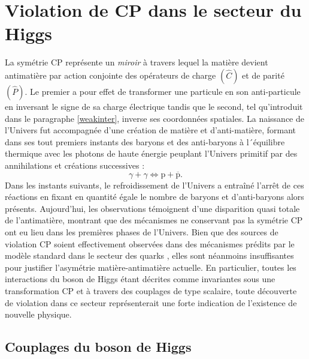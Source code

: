 \chapter{Violation de CP dans le secteur du Higgs}
\label{violCP}

La symétrie CP représente un \textit{miroir} à travers lequel la matière devient antimatière par action conjointe des opérateurs de charge $(\hat{C})$ et de parité $(\hat{P})$. Le premier a pour effet de transformer une particule en son anti-particule en inversant le signe de sa charge électrique tandis que le second, tel qu'introduit dans le paragraphe \ref{weakinter}, inverse ses coordonnées spatiales. La naissance de l'Univers fut accompagnée d'une création de matière et d'anti-matière, formant dans ses tout premiers instants des baryons et des anti-baryons à l´équilibre thermique avec les photons de haute énergie peuplant l'Univers primitif par des annihilations et créations successives : $$\gamma+\gamma\Longleftrightarrow \mbox{p}+\overline{\mbox{p}}.$$ 
Dans les instants suivants, le refroidissement de l'Univers a entraîné l'arrêt de ces réactions en fixant en quantité égale le nombre de baryons et d'anti-baryons alors présents. Aujourd'hui, les observations témoignent d'une disparition quasi totale de l'antimatière, montrant que des mécanismes ne conservant pas la symétrie CP ont eu lieu dans les premières phases de l'Univers. Bien que des sources de violation CP soient effectivement observées dans des mécanismes prédits par le modèle standard dans le secteur des quarks \cite{Fritzsch_1999}, elles sont néanmoins insuffisantes pour justifier l'asymétrie matière-antimatière actuelle. En particulier, toutes les interactions du boson de Higgs étant décrites comme invariantes sous une transformation CP et à travers des couplages de type scalaire, toute découverte de violation dans ce secteur représenterait une forte indication de l'existence de nouvelle physique. 

\section{Couplages du boson de Higgs}
\label{decays}


